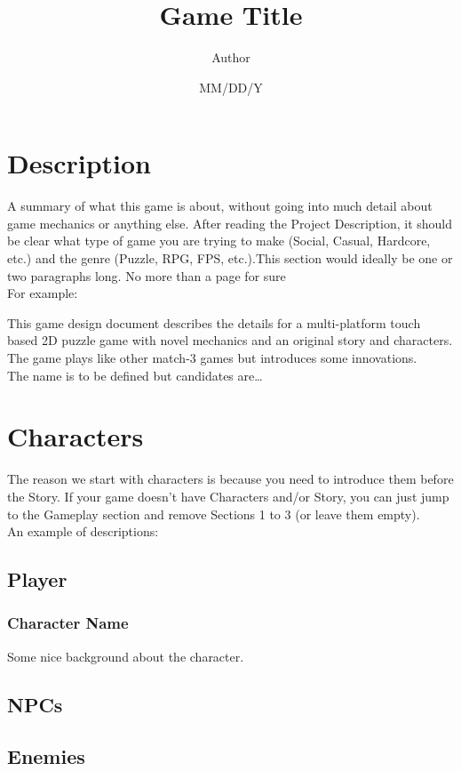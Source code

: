 \documentclass[12pt, a4paper]{article}
\title{Game Title}
\author{Author}
\date{MM/DD/Y}
\begin{document}
\maketitle
\newpage
\tableofcontents
\newpage

\section{Description}
A summary of what this game is about, without going into much detail about game mechanics or anything else. After reading the Project Description, it should be clear what type of game you are trying to make (Social, Casual, Hardcore, etc.) and the genre (Puzzle, RPG, FPS, etc.).This section would ideally be one or two paragraphs long. No more than a page for sure\\

For example:

\begin{tcolorbox}
This game design document describes the details for a multi-platform touch based 2D puzzle game with novel mechanics and an original story and characters.\\

The game plays like other match-3 games but introduces some innovations.\\

The name is to be defined but candidates are…
\end{tcolorbox}

\section{Characters}
The reason we start with characters is because you need to introduce them before the Story. If your game doesn’t have Characters and/or Story, you can just jump to the Gameplay section and remove Sections 1 to 3 (or leave them empty).\\

An example of descriptions:
\begin{tcolorbox}
    \subsection{Player}
    \subsubsection*{Character Name}
    Some nice background about the character.
    
    \subsection{NPCs}
    \subsection{Enemies}
\end{tcolorbox}
\end{document}
